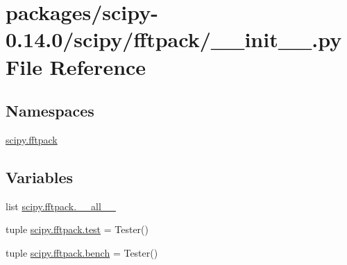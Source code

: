 \hypertarget{packages_2scipy-0_814_80_2scipy_2fftpack_2____init_____8py}{}\section{packages/scipy-\/0.14.0/scipy/fftpack/\+\_\+\+\_\+init\+\_\+\+\_\+.py File Reference}
\label{packages_2scipy-0_814_80_2scipy_2fftpack_2____init_____8py}
\subsection*{Namespaces}
\begin{DoxyCompactItemize}
\item 
 \hyperlink{namespacescipy_1_1fftpack}{scipy.\+fftpack}
\end{DoxyCompactItemize}
\subsection*{Variables}
\begin{DoxyCompactItemize}
\item 
list \hyperlink{namespacescipy_1_1fftpack_a7ca2dcf4bb2b229a4da1f2633bde070e}{scipy.\+fftpack.\+\_\+\+\_\+all\+\_\+\+\_\+}
\item 
tuple \hyperlink{namespacescipy_1_1fftpack_a28c62e1d92ccd84a78bafefbc4cb67a5}{scipy.\+fftpack.\+test} = Tester()
\item 
tuple \hyperlink{namespacescipy_1_1fftpack_a18a86b13f1ebf6ffe7157c7843ce3ad4}{scipy.\+fftpack.\+bench} = Tester()
\end{DoxyCompactItemize}
